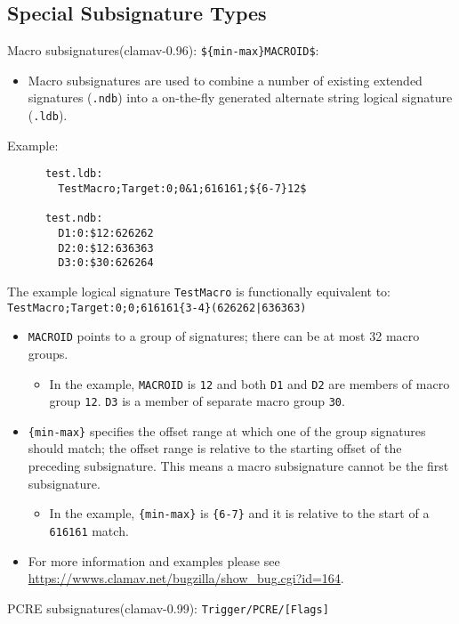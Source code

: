\documentclass[a4paper,titlepage,12pt]{article}
\begin{document}
    \subsection{Special Subsignature Types}
    Macro subsignatures(clamav-0.96): \verb+${min-max}MACROID$+:
    \begin{itemize}
      \item Macro subsignatures are used to combine a number of existing extended
      signatures (\verb+.ndb+) into a on-the-fly generated alternate string logical
      signature (\verb+.ldb+).
    \end{itemize}
    Example:
    \begin{verbatim}
      test.ldb:
        TestMacro;Target:0;0&1;616161;${6-7}12$

      test.ndb:
        D1:0:$12:626262
        D2:0:$12:636363
        D3:0:$30:626264
    \end{verbatim}
    The example logical signature \verb+TestMacro+ is functionally equivalent to:\\
    \verb+TestMacro;Target:0;0;616161{3-4}(626262|636363)+
    \begin{itemize}
	\item \verb+MACROID+ points to a group of signatures; there can be at most 32 macro groups.
      \begin{itemize}
      \item In the example, \verb+MACROID+ is \verb+12+ and both \verb+D1+ and \verb+D2+ are members 
        of macro group \verb+12+. \verb+D3+ is a member of separate macro group \verb+30+.
      \end{itemize}
    \item \verb+{min-max}+ specifies the offset range at which one of the group signatures should match;
      the offset range is relative to the starting offset of the preceding subsignature. This means a
      macro subsignature cannot be the first subsignature.
      \begin{itemize}
      \item In the example, \verb+{min-max}+ is \verb+{6-7}+ and it is relative to the start of a \verb+616161+ match.
      \end{itemize}
	\item For more information and examples please see \url{https://wwws.clamav.net/bugzilla/show_bug.cgi?id=164}.
    \end{itemize}
    PCRE subsignatures(clamav-0.99): \verb+Trigger/PCRE/[Flags]+
\end{document}
